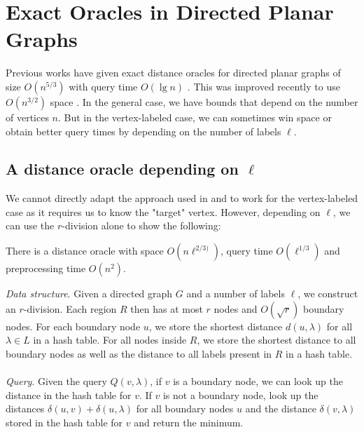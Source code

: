 \section{Exact Oracles in Directed Planar Graphs}\label{exactPlanar}

Previous works have given exact distance oracles for directed planar graphs of size
$O(n^{5/3})$ with query time $O(\lg n)$ \cite{cohen2017fast}. This was improved recently
to use $O(n^{3/2})$ space \cite{gawrychowski2017better}. In the general case, we have
bounds that depend on the number of vertices $n$. But in the vertex-labeled case, we can
sometimes win space or obtain better query times by depending on the number of labels $\ell$.

\subsection{A distance oracle depending on $\ell$}
We cannot directly adapt the approach used in \cite{cohen2017fast} and \cite{gawrychowski2017better} to work
for the vertex-labeled case as it requires us to know the "target" vertex. However,
depending on $\ell$, we can use the $r$-division alone to show the following:
\begin{thm}\label{thm1}
  There is a distance oracle with space $O(n\ell^{2/3)})$, query time $O(\ell^{1/3})$ and
  preprocessing time $O(n^2)$.
\end{thm}
\textit{Data structure}. Given a directed graph $G$ and a number of labels $\ell$, we
construct an $r$-division. Each region $R$ then has at most $r$ nodes and $O(\sqrt{r})$
boundary nodes. For each boundary node $u$, we store the shortest distance $d(u,\lambda)$
for all $\lambda \in L$ in a hash table. For all nodes inside $R$, we store the shortest
distance to all
boundary nodes as well as the distance to all labels present in $R$ in a hash table. \\
\\
\textit{Query}. Given the query $Q(v, \lambda)$, if $v$ is a boundary node, we can look
up the distance in the hash table for $v$. If $v$ is not a boundary node, look up the
distances $\delta(u,v)+\delta(u,\lambda)$ for all boundary nodes $u$ and the distance
$\delta(v,\lambda)$ stored in the hash table for $v$ and return the minimum.

